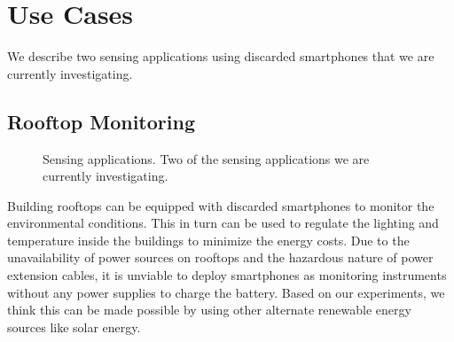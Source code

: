 \section{Use Cases}
\label{sec-usecases}
We describe two sensing applications using discarded smartphones that we are
currently investigating.
\subsection{Rooftop Monitoring}
\begin{figure}[t]
  \centering
  \quad


  \vspace*{-0.1in}

  \caption{\small Sensing applications.
  \textnormal{Two of the sensing applications we are currently investigating.}}

  \vspace*{-0.1in}

\end{figure}
Building rooftops can be equipped with discarded smartphones to monitor the
environmental conditions. This in turn can be used to regulate the lighting and
temperature inside the buildings to minimize the energy costs.
Due to the unavailability of power sources on rooftops and the hazardous nature of
power extension cables, it is unviable to deploy smartphones as monitoring
instruments without any power supplies to charge the battery.
Based on our experiments, we think this can be made possible by using other
alternate renewable energy sources like solar energy.

